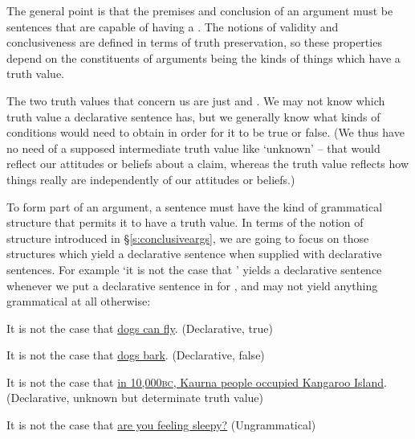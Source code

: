 The general point is that the premises and conclusion of an argument must be sentences that are capable of having a . The notions of validity and conclusiveness are defined in terms of truth preservation, so these properties depend on the constituents of arguments being the kinds of things which have a truth value.

The two truth values that concern us are just  and . We may not know which truth value a declarative sentence has, but we generally know what kinds of conditions would need to obtain in order for it to be true or false. (We thus have no need of a supposed intermediate truth value like `unknown' – that would reflect our attitudes or beliefs about a claim, whereas the truth value reflects how things really are independently of our attitudes or beliefs.)

To form part of an argument, a sentence must have the kind of grammatical structure that permits it to have a truth value. In terms of the notion of structure introduced in §\ref{s:conclusiveargs}, we are going to focus on those structures which yield a declarative sentence when supplied with declarative sentences. For example `it is not the case that ' yields a declarative sentence whenever we put a declarative sentence in for , and may not yield anything grammatical at all otherwise: \begin{earg}
	\item[\ex{decl1}] It is not the case that \underline{dogs can fly}. (Declarative, true)
	\item[\ex{decl2}] It is not the case that \underline{dogs bark}. (Declarative, false)
	\item[\ex{decl3}] It is not the case that \underline{in 10,000\textsc{bc}, Kaurna people occupied Kangaroo Island}. (Declarative, unknown but determinate truth value)
	\item[\ex{decl4}] It is not the case that \underline{are you feeling sleepy?} (Ungrammatical)
\end{earg}


